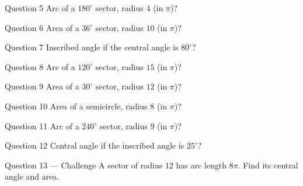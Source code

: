 \documentclass[11pt]{article}
\begin{document}
\begin{qbox}{Question 5}
Arc of a $180^\circ$ sector, radius $4$ (in $\pi$)?\workspace{2.4cm}
\end{qbox}

\begin{qbox}{Question 6}
Area of a $36^\circ$ sector, radius $10$ (in $\pi$)?\workspace{2.4cm}
\end{qbox}

\begin{qbox}{Question 7}
Inscribed angle if the central angle is $80^\circ$?\workspace{2.4cm}
\end{qbox}

\begin{qbox}{Question 8}
Arc of a $120^\circ$ sector, radius $15$ (in $\pi$)?\workspace{2.4cm}
\end{qbox}

\begin{qbox}{Question 9}
Area of a $30^\circ$ sector, radius $12$ (in $\pi$)?\workspace{2.4cm}
\end{qbox}

\begin{qbox}{Question 10}
Area of a semicircle, radius $8$ (in $\pi$)?\workspace{2.4cm}
\end{qbox}

\begin{qbox}{Question 11}
Arc of a $240^\circ$ sector, radius $9$ (in $\pi$)?\workspace{2.4cm}
\end{qbox}

\begin{qbox}{Question 12}
Central angle if the inscribed angle is $25^\circ$?\workspace{2.4cm}
\end{qbox}

\begin{qbox}{Question 13 --- Challenge}
A sector of radius $12$ has arc length $8\pi$. Find its central angle and area.\workspace{3cm}
\end{qbox}

\clearpage
{}
\end{document}

